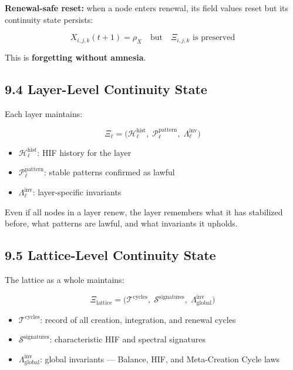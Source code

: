 \textbf{Renewal-safe reset:} when a node enters renewal, its field values reset but its continuity state persists:

\[
X_{i,j,k}(t+1) = \rho_X \quad \text{but} \quad \Xi_{i,j,k} \text{ is preserved}
\]

This is \textbf{forgetting without amnesia}.

\subsection{9.4 Layer-Level Continuity State}\label{layer-level-continuity-state}

Each layer maintains:

\[
\Xi_{\ell} = \big( \mathcal{H}_{\ell}^{\text{hist}},\; \mathcal{P}_{\ell}^{\text{pattern}},\;
\Lambda_{\ell}^{\text{inv}} \big)
\]

\begin{itemize}
\tightlist
\item
  \(\mathcal{H}_{\ell}^{\text{hist}}\): HIF history for the layer
\item
  \(\mathcal{P}_{\ell}^{\text{pattern}}\): stable patterns confirmed as lawful
\item
  \(\Lambda_{\ell}^{\text{inv}}\): layer-specific invariants
\end{itemize}

Even if all nodes in a layer renew, the layer remembers what it has stabilized before, what patterns are lawful, and what invariants it upholds.

\subsection{9.5 Lattice-Level Continuity State}\label{lattice-level-continuity-state}

The lattice as a whole maintains:

\[
\Xi_{\text{lattice}} = \big( \mathcal{T}^{\text{cycles}},\;
\mathcal{S}^{\text{signatures}},\; \Lambda_{\text{global}}^{\text{inv}} \big)
\]

\begin{itemize}
\tightlist
\item
  \(\mathcal{T}^{\text{cycles}}\): record of all creation, integration, and renewal cycles
\item
  \(\mathcal{S}^{\text{signatures}}\): characteristic HIF and spectral signatures
\item
  \(\Lambda_{\text{global}}^{\text{inv}}\): global invariants --- Balance, HIF, and Meta-Creation Cycle laws
\end{itemize}

